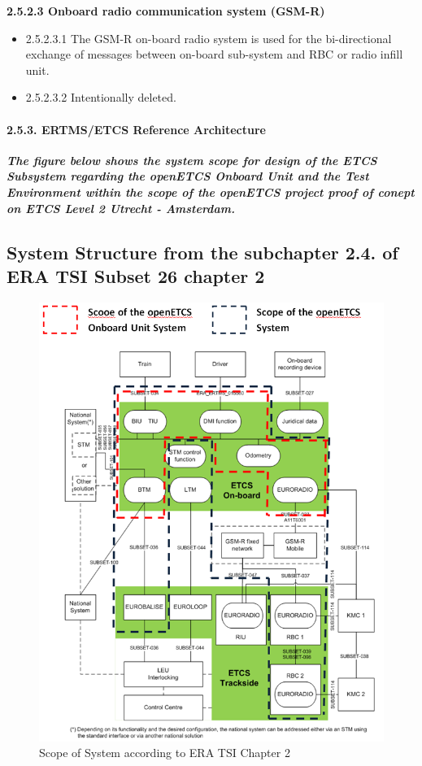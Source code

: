\textbf{2.5.2.3	Onboard radio communication system (GSM-R)}
\begin{itemize}
\item 2.5.2.3.1	The GSM-R on-board radio system is used for the bi-directional exchange of messages between on-board sub-system and RBC or radio infill unit. 
\item 2.5.2.3.2	Intentionally deleted.
\end{itemize}

\paragraph{2.5.3. ERTMS/ETCS Reference Architecture}
\textit{\textbf{The figure below shows the system scope for design of the ETCS Subsystem regarding the openETCS Onboard Unit and the Test Environment within the scope of the openETCS project proof of conept on ETCS Level 2 Utrecht - Amsterdam.}}

\subsection{System Structure from the subchapter 2.4. of ERA TSI Subset 26 chapter 2}
\begin{figure}[h]
\includegraphics[scale=0.7]{images/ArchitectureSRS}
\caption{Scope of System according to ERA TSI Chapter 2}
\label{Scope of System according to ERA TSI Chapter 2}
\end{figure}

